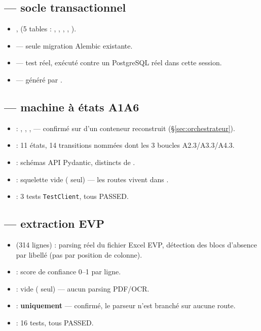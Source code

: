 \documentclass[11pt,a4paper]{article}
\begin{document}
\subsection*{ --- socle transactionnel}
\begin{itemize}[leftmargin=1.3em]
\item {},  (5 tables : , , , , ).
\item {} --- seule migration Alembic existante.
\item {} --- test r\'eel, ex\'ecut\'e contre un PostgreSQL r\'eel dans cette session.
\item {} --- g\'en\'er\'e par .
\end{itemize}

\subsection*{ --- machine \`a \'etats A1\textrightarrow A6}
\begin{itemize}[leftmargin=1.3em]
\item {} : , , ,  --- confirm\'e sur  d'un conteneur reconstruit (\S\ref{sec:orchestrateur}).
\item {} : 11 \'etats, 14 transitions nomm\'ees dont les 3 boucles A2.3/A3.3/A4.3.
\item {} : sch\'emas API Pydantic, distincts de .
\item {} : squelette vide ( seul) --- les routes vivent dans .
\item {} : 3 tests \texttt{TestClient}, tous PASSED.
\end{itemize}

\subsection*{ --- extraction EVP}
\begin{itemize}[leftmargin=1.3em]
\item {} (314 lignes) : parsing r\'eel du fichier Excel EVP, d\'etection des blocs d'absence par libell\'e (pas par position de colonne).
\item {} : score de confiance 0--1 par ligne.
\item {} : vide ( seul) --- aucun parsing PDF/OCR.
\item {} : \textbf{ uniquement} --- confirm\'e, le parseur n'est branch\'e sur aucune route.
\item {} : 16 tests, tous PASSED.
\end{itemize}
\end{document}
